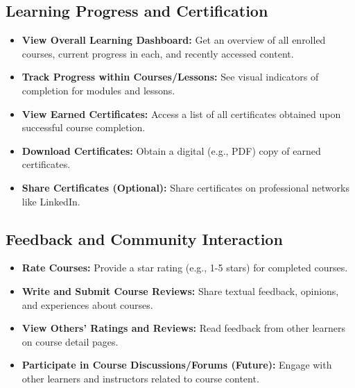\documentclass[12pt, a4paper]{report} %
\begin{document}
  \subsection{Learning Progress and Certification}
    \begin{itemize}
        \item \textbf{View Overall Learning Dashboard:} Get an overview of all enrolled courses, current progress in each, and recently accessed content.
        \item \textbf{Track Progress within Courses/Lessons:} See visual indicators of completion for modules and lessons.
        \item \textbf{View Earned Certificates:} Access a list of all certificates obtained upon successful course completion.
        \item \textbf{Download Certificates:} Obtain a digital (e.g., PDF) copy of earned certificates.
        \item \textbf{Share Certificates (Optional):} Share certificates on professional networks like LinkedIn.
    \end{itemize}
  \subsection{Feedback and Community Interaction}
    \begin{itemize}
        \item \textbf{Rate Courses:} Provide a star rating (e.g., 1-5 stars) for completed courses.
        \item \textbf{Write and Submit Course Reviews:} Share textual feedback, opinions, and experiences about courses.
        \item \textbf{View Others' Ratings and Reviews:} Read feedback from other learners on course detail pages.
        \item \textbf{Participate in Course Discussions/Forums (Future):} Engage with other learners and instructors related to course content.
    \end{itemize}
\end{document}
